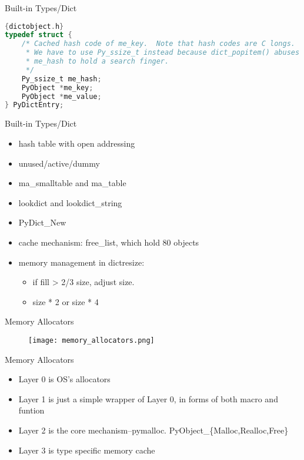 \documentclass[xcolor=svgnames]{beamer}
\begin{document}
\begin{frame}[fragile]{Built-in Types/Dict}
\begin{lstlisting}[language=C]{dictobject.h}
typedef struct {
    /* Cached hash code of me_key.  Note that hash codes are C longs.
     * We have to use Py_ssize_t instead because dict_popitem() abuses
     * me_hash to hold a search finger.
     */
    Py_ssize_t me_hash;
    PyObject *me_key;
    PyObject *me_value;
} PyDictEntry;
\end{lstlisting} 
\end{frame}

\begin{frame}{Built-in Types/Dict}
\begin{itemize} 
  \item hash table with open addressing
  \item unused/active/dummy
  \item ma\_smalltable and ma\_table
  \item lookdict and lookdict\_string
  \item PyDict\_New
  \item cache mechanism: free\_list, which hold 80 objects
  \item memory management in dictresize:
    \begin{itemize} 
        \item if fill > 2/3 size, adjust size.
        \item size * 2 or size * 4
    \end{itemize} 
\end{itemize} 
\end{frame}

\begin{frame}{Memory Allocators}
    \begin{figure}
       \begin{center}
           \texttt{[image: memory\_allocators.png]}
       \end{center}
\end{figure}
\end{frame}

\begin{frame}{Memory Allocators}
\begin{itemize} 
  \item Layer 0 is OS's allocators
  \item Layer 1 is just a simple wrapper of Layer 0, in forms of both macro and funtion
  \item Layer 2 is the core mechanism--pymalloc. PyObject\_\{Malloc,Realloc,Free\}
  \item Layer 3 is type specific memory cache
\end{itemize} 
\end{frame}
\end{document}
